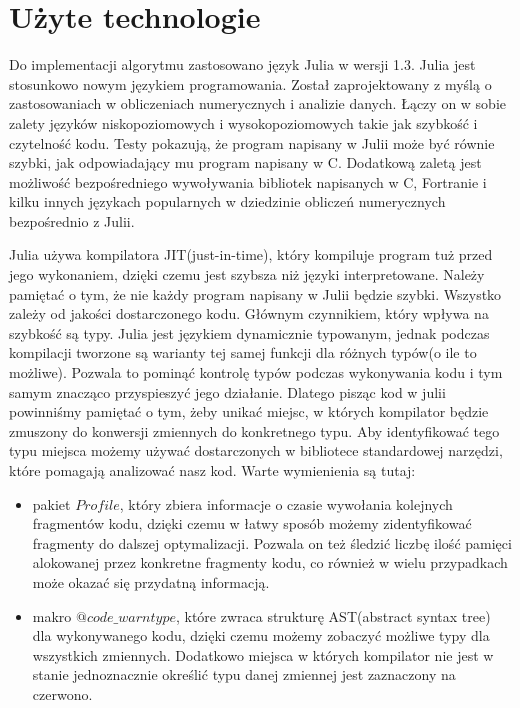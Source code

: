 \section{Użyte technologie}
Do implementacji algorytmu zastosowano język Julia\cite{JULIA-PUB} w wersji 1.3. Julia jest stosunkowo nowym językiem programowania. Został zaprojektowany 
z myślą o zastosowaniach w obliczeniach numerycznych i analizie danych. Łączy on w sobie zalety języków niskopoziomowych i wysokopoziomowych takie jak szybkość 
i czytelność kodu. Testy pokazują, że program napisany w Julii może być równie szybki, jak odpowiadający mu program napisany w C\cite{JULIA-PERFORMANCE}. 
Dodatkową zaletą jest możliwość bezpośredniego wywoływania bibliotek napisanych w C, Fortranie i kilku innych językach popularnych w dziedzinie 
obliczeń numerycznych bezpośrednio z Julii.

Julia używa kompilatora JIT(just-in-time), który kompiluje program tuż przed jego wykonaniem, dzięki czemu jest szybsza 
niż języki interpretowane. Należy pamiętać o tym, że nie każdy program napisany w Julii będzie szybki. Wszystko zależy od jakości dostarczonego kodu.
Głównym czynnikiem, który wpływa na szybkość są typy. Julia jest językiem dynamicznie typowanym, jednak podczas kompilacji tworzone są warianty tej samej 
funkcji dla różnych typów(o ile to możliwe). Pozwala to pominąć kontrolę typów podczas wykonywania kodu i tym samym znacząco przyspieszyć jego działanie.
Dlatego pisząc kod w julii powinniśmy pamiętać o tym, żeby unikać miejsc, w których kompilator będzie zmuszony do konwersji zmiennych do konkretnego typu. 
Aby identyfikować tego typu miejsca możemy używać dostarczonych w bibliotece standardowej narzędzi, które pomagają analizować nasz kod. 
Warte wymienienia są tutaj:

\begin{itemize}
    \item pakiet $Profile$, który zbiera informacje o czasie wywołania kolejnych fragmentów kodu, dzięki czemu w łatwy sposób 
    możemy zidentyfikować fragmenty do dalszej optymalizacji. Pozwala on też śledzić liczbę ilość pamięci alokowanej przez konkretne fragmenty 
    kodu, co również w wielu przypadkach może okazać się przydatną informacją.
    \item makro $@code\_warntype$, które zwraca strukturę AST(abstract syntax tree) dla wykonywanego kodu, dzięki czemu możemy zobaczyć możliwe typy dla wszystkich zmiennych. 
    Dodatkowo miejsca w których kompilator nie jest w stanie jednoznacznie określić typu danej zmiennej jest zaznaczony na czerwono.
\end{itemize}

